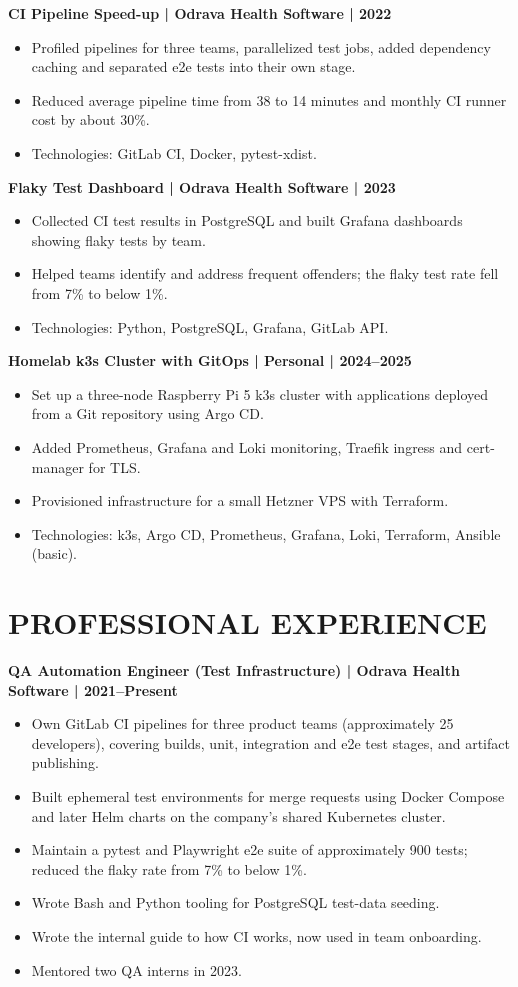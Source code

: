 \documentclass[11pt,a4paper]{article}
\begin{document}
\textbf{CI Pipeline Speed-up | Odrava Health Software | 2022}
\begin{itemize}
\item Profiled pipelines for three teams, parallelized test jobs, added dependency caching and separated e2e tests into their own stage.
\item Reduced average pipeline time from 38 to 14 minutes and monthly CI runner cost by about 30\%.
\item Technologies: GitLab CI, Docker, pytest-xdist.
\end{itemize}

\textbf{Flaky Test Dashboard | Odrava Health Software | 2023}
\begin{itemize}
\item Collected CI test results in PostgreSQL and built Grafana dashboards showing flaky tests by team.
\item Helped teams identify and address frequent offenders; the flaky test rate fell from 7\% to below 1\%.
\item Technologies: Python, PostgreSQL, Grafana, GitLab API.
\end{itemize}

\textbf{Homelab k3s Cluster with GitOps | Personal | 2024--2025}
\begin{itemize}
\item Set up a three-node Raspberry Pi 5 k3s cluster with applications deployed from a Git repository using Argo CD.
\item Added Prometheus, Grafana and Loki monitoring, Traefik ingress and cert-manager for TLS.
\item Provisioned infrastructure for a small Hetzner VPS with Terraform.
\item Technologies: k3s, Argo CD, Prometheus, Grafana, Loki, Terraform, Ansible (basic).
\end{itemize}

\section*{PROFESSIONAL EXPERIENCE}
\textbf{QA Automation Engineer (Test Infrastructure) | Odrava Health Software | 2021--Present}
\begin{itemize}
\item Own GitLab CI pipelines for three product teams (approximately 25 developers), covering builds, unit, integration and e2e test stages, and artifact publishing.
\item Built ephemeral test environments for merge requests using Docker Compose and later Helm charts on the company's shared Kubernetes cluster.
\item Maintain a pytest and Playwright e2e suite of approximately 900 tests; reduced the flaky rate from 7\% to below 1\%.
\item Wrote Bash and Python tooling for PostgreSQL test-data seeding.
\item Wrote the internal guide to how CI works, now used in team onboarding.
\item Mentored two QA interns in 2023.
\end{itemize}
\end{document}
